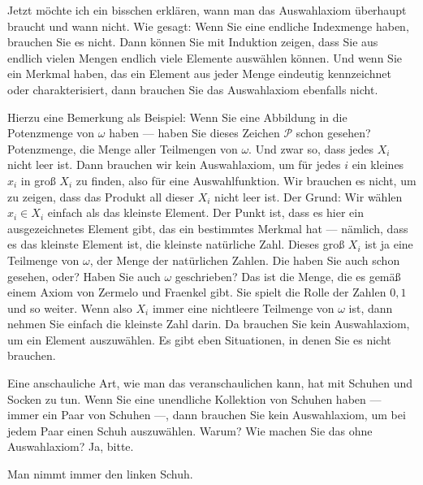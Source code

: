 \begin{spoken-clean}[00:19:30 - 00:21:00]
Jetzt möchte ich ein bisschen erklären, wann man das Auswahlaxiom überhaupt braucht und wann nicht. Wie gesagt: Wenn Sie eine endliche Indexmenge haben, brauchen Sie es nicht. Dann können Sie mit Induktion zeigen, dass Sie aus endlich vielen Mengen endlich viele Elemente auswählen können. Und wenn Sie ein Merkmal haben, das ein Element aus jeder Menge eindeutig kennzeichnet oder charakterisiert, dann brauchen Sie das Auswahlaxiom ebenfalls nicht.

Hierzu eine Bemerkung als Beispiel: Wenn Sie eine Abbildung in die Potenzmenge von $\omega$ haben --- haben Sie dieses Zeichen $\mathcal{P}$ schon gesehen? Potenzmenge, die Menge aller Teilmengen von $\omega$. Und zwar so, dass jedes $X_i$ nicht leer ist. Dann brauchen wir kein Auswahlaxiom, um für jedes $i$ ein kleines $x_i$ in groß $X_i$ zu finden, also für eine Auswahlfunktion. Wir brauchen es nicht, um zu zeigen, dass das Produkt all dieser $X_i$ nicht leer ist. Der Grund: Wir wählen $x_i \in X_i$ einfach als das kleinste Element. Der Punkt ist, dass es hier ein ausgezeichnetes Element gibt, das ein bestimmtes Merkmal hat --- nämlich, dass es das kleinste Element ist, die kleinste natürliche Zahl. Dieses groß $X_i$ ist ja eine Teilmenge von $\omega$, der Menge der natürlichen Zahlen. Die haben Sie auch schon gesehen, oder? Haben Sie auch $\omega$ geschrieben? Das ist die Menge, die es gemäß einem Axiom von Zermelo und Fraenkel gibt. Sie spielt die Rolle der Zahlen $0, 1$ und so weiter. Wenn also $X_i$ immer eine nichtleere Teilmenge von $\omega$ ist, dann nehmen Sie einfach die kleinste Zahl darin. Da brauchen Sie kein Auswahlaxiom, um ein Element auszuwählen. Es gibt eben Situationen, in denen Sie es nicht brauchen.

Eine anschauliche Art, wie man das veranschaulichen kann, hat mit Schuhen und Socken zu tun. Wenn Sie eine unendliche Kollektion von Schuhen haben --- immer ein Paar von Schuhen ---, dann brauchen Sie kein Auswahlaxiom, um bei jedem Paar einen Schuh auszuwählen. Warum? Wie machen Sie das ohne Auswahlaxiom? Ja, bitte.
\end{spoken-clean}

\begin{student-interaction}[Studentenantwort]
Man nimmt immer den linken Schuh.
\end{student-interaction}


